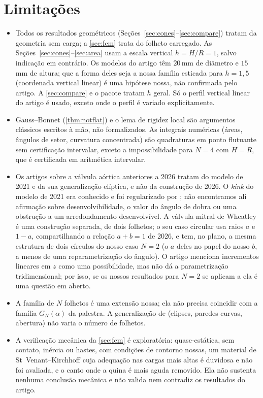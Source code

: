 \documentclass[11pt,a4paper]{article}
\theoremstyle{plain}
\theoremstyle{remark}
\begin{document}
\section{Limitações}\label{sec:lim}
\begin{itemize}
\item Todos os resultados geométricos (Seções~\ref{sec:cones}--\ref{sec:compare}) tratam da geometria sem carga; a
  \cref{sec:fem} trata do folheto carregado. As Seções~\ref{sec:cones}--\ref{sec:area} usam a escala vertical $h=H/R=1$,
  salvo indicação em contrário. Os modelos do artigo têm $20$\,mm de diâmetro e $15$\,mm de altura; que a forma deles seja a
  nossa família esticada para $h=1{,}5$ (coordenada vertical linear) é uma hipótese nossa, não confirmada pelo artigo. A
  \cref{sec:compare} e o pacote tratam $h$ geral. Só o perfil vertical linear do artigo é usado, exceto onde o perfil é
  variado explicitamente.
\item Gauss--Bonnet (\cref{thm:notflat}) e o lema de rigidez local são argumentos clássicos escritos à mão, não formalizados.
  As integrais numéricas (áreas, ângulos de setor, curvatura concentrada) são quadraturas em ponto flutuante sem certificação
  intervalar, exceto a impossibilidade para $N=4$ com $H=R$, que é certificada em aritmética intervalar.
\item Os artigos sobre a válvula aórtica anteriores a 2026 \citep{McKee2021,Rebolledo2023,Oliveira2022,Oliveira2024} tratam do
  modelo de 2021 e da sua generalização elíptica, e não da construção de 2026. O \emph{kink} do modelo de 2021 era conhecido e
  foi regularizado por \citet{Rebolledo2023}; não encontramos ali afirmação sobre desenvolvibilidade, o valor do ângulo de
  dobra ou uma obstrução a um arredondamento desenvolvível. A válvula mitral de Wheatley \citep{Oliveira2025} é uma construção
  separada, de dois folhetos; o seu caso circular usa raios $a$ e $1-a$, compartilhando a relação $a+b=1$ de 2026, e tem, no
  plano, a mesma estrutura de dois círculos do nosso caso $N=2$ (o $a$ deles no papel do nosso $b$, a menos de uma
  reparametrização do ângulo). O artigo menciona incrementos lineares em $z$ como uma possibilidade, mas não dá a
  parametrização tridimensional; por isso, se os nossos resultados para $N=2$ se aplicam a ela é uma questão em aberto.
\item A família de $N$ folhetos é uma extensão nossa; ela não precisa coincidir com a família $G_N(\alpha)$ da palestra. A
  generalização de \citet{Oliveira2022} (elipses, paredes curvas, abertura) não varia o número de folhetos.
\item A verificação mecânica da \cref{sec:fem} é exploratória: quase-estática, sem contato, inércia ou hastes, com condições de
  contorno nossas, um material de St~Venant--Kirchhoff cuja adequação nas cargas mais altas é duvidosa e não foi avaliada, e
  o canto onde a quina é mais aguda removido. Ela não sustenta nenhuma conclusão mecânica e não valida nem contradiz os
  resultados do artigo.
\end{itemize}
\end{document}
